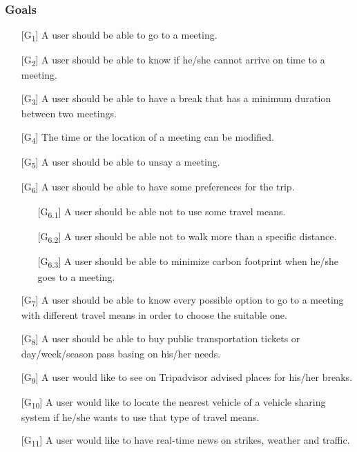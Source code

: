 \documentclass[12pt,titlepage]{article}
\begin{document}
\subsubsection{Goals}\label{RASD}
\begin{itemize}

\item [{[G\textsubscript{1}]}]	A user should be able to go to a meeting.
\item [{[G\textsubscript{2}]}]	A user should be able to know if he/she cannot arrive on time to a meeting.
\item [{[G\textsubscript{3}]}]	A user should be able to have a break that has a minimum duration between two meetings.
\item [{[G\textsubscript{4}]}]	The time or the location of a meeting can be modified.

\item [{[G\textsubscript{5}]}]  A user should be able to unsay  a meeting.
\item  [{[G\textsubscript{6}]}] A user should be able to have some preferences for the trip.
\begin{itemize}
\item [{[G\textsubscript{6.1}]}]	A user should be able not to use some travel means.
\item [{[G\textsubscript{6.2}]}]	A user should be able not to walk more than a specific distance.
\item [{[G\textsubscript{6.3}]}] A user should be able to minimize carbon footprint when he/she goes to a meeting.
\end{itemize}


\item [{[G\textsubscript{7}]}] A user should be able to know every possible option to go to a meeting with different travel means in order to choose the suitable one.
\item [{[G\textsubscript{8}]}]	A user should be able to buy public transportation tickets or day/week/season pass basing on his/her needs.
\item [{[G\textsubscript{9}]}]	A user would like to see on Tripadvisor advised places for his/her breaks.
\item [{[G\textsubscript{10}]}]	A user would like to locate the nearest vehicle of a vehicle sharing system if he/she wants to use that type of travel means.
\item [{[G\textsubscript{11}]}]	A user would like to have real-time news on strikes, weather and traffic.

 \end{itemize}
\end{document}
